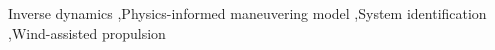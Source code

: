 \documentclass[preprint,11pt,authoryear]{elsarticle}
\begin{document}
\begin{frontmatter}

    \begin{abstract}
        

    \end{abstract}


    \begin{keyword}
    Inverse dynamics \sep Physics-informed maneuvering model \sep System identification \sep Wind-assisted propulsion 



    \end{keyword}

\end{frontmatter}
\FloatBarrier
\end{document}
